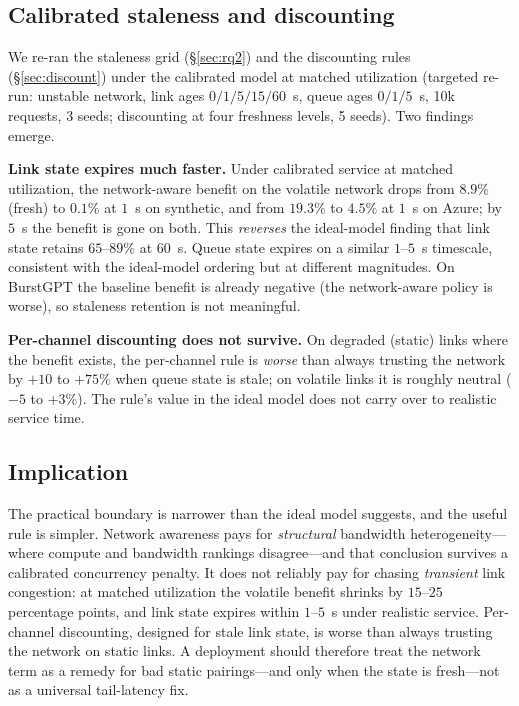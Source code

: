 \subsection{Calibrated staleness and discounting}
We re-ran the staleness grid (\S\ref{sec:rq2}) and the discounting rules (\S\ref{sec:discount})
under the calibrated model at matched utilization (targeted re-run: unstable network, link ages
$0/1/5/15/60$~s, queue ages $0/1/5$~s, 10k requests, 3 seeds; discounting at four freshness levels,
5 seeds). Two findings emerge.

\textbf{Link state expires much faster.} Under calibrated service at matched utilization, the
network-aware benefit on the volatile network drops from $8.9\%$ (fresh) to $0.1\%$ at $1$~s on
synthetic, and from $19.3\%$ to $4.5\%$ at $1$~s on Azure; by $5$~s the benefit is gone on both.
This \emph{reverses} the ideal-model finding that link state retains $65$--$89\%$ at $60$~s.
Queue state expires on a similar $1$--$5$~s timescale, consistent with the ideal-model ordering but
at different magnitudes. On BurstGPT the baseline benefit is already negative (the network-aware
policy is worse), so staleness retention is not meaningful.

\textbf{Per-channel discounting does not survive.} On degraded (static) links where the benefit
exists, the per-channel rule is \emph{worse} than always trusting the network by $+10$ to
$+75\%$ when queue state is stale; on volatile links it is roughly neutral ($-5$ to $+3\%$). The
rule's value in the ideal model does not carry over to realistic service time.

\subsection{Implication}
The practical boundary is narrower than the ideal model suggests, and the useful rule is simpler.
Network awareness pays for \emph{structural} bandwidth heterogeneity---where compute and bandwidth
rankings disagree---and that conclusion survives a calibrated concurrency penalty. It does not
reliably pay for chasing \emph{transient} link congestion: at matched utilization the volatile
benefit shrinks by $15$--$25$ percentage points, and link state expires within $1$--$5$~s under
realistic service. Per-channel discounting, designed for stale link state, is worse than always
trusting the network on static links. A deployment should therefore treat the network term as a
remedy for bad static pairings---and only when the state is fresh---not as a universal
tail-latency fix.
